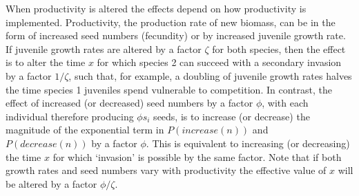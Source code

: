 When productivity is altered the effects depend on how productivity is implemented. Productivity, the production rate of new biomass, can be in the form of increased seed numbers (fecundity) or by increased juvenile growth rate. If juvenile growth rates are altered by a factor $\zeta$ for both species, then the effect is to alter the time $x$ for which species 2 can succeed with a secondary invasion by a factor $1/\zeta$, such that, for example, a doubling of juvenile growth rates halves the time species 1 juveniles spend vulnerable to competition.  In contrast, the effect of increased (or decreased) seed numbers by a factor $\phi$, with each individual therefore producing $\phi s_i$ seeds, is to increase (or decrease) the magnitude of the exponential term in $P(increase(n))$ and $P(decrease(n))$ by a factor $\phi$. This is equivalent to increasing (or decreasing) the time $x$ for which `invasion' is possible by the same factor. Note that if both growth rates and seed numbers vary with productivity the effective value of $x$ will be altered by a factor $\phi / \zeta$.

